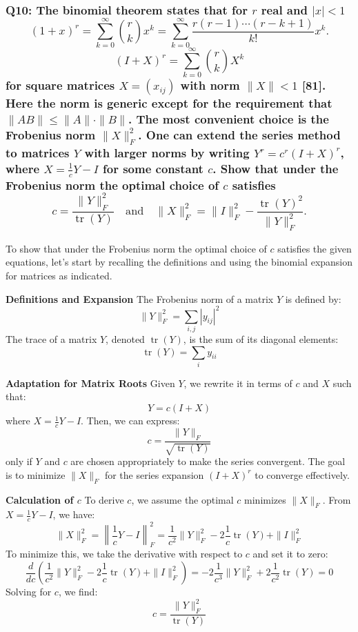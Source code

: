 \documentclass[8pt]{article}
\begin{document}
\subsubsection*{Q10: The binomial theorem states that for \(r\) real and \(|x| < 1\)
\[ (1 + x)^r = \sum_{k=0}^{\infty} \binom{r}{k} x^k = \sum_{k=0}^{\infty} \frac{r(r-1) \cdots (r-k+1)}{k!} x^k. \]
\[ (I + X)^r = \sum_{k=0}^{\infty} \binom{r}{k} X^k \]
for square matrices \(X = (x_{ij})\) with norm \(\|X\| < 1\) [81]. Here the norm is generic except for the requirement that \(\|AB\| \leq \|A\| \cdot \|B\|\). The most convenient choice is the Frobenius norm \(\|X\|_F^2\). One can extend the series method to matrices \(Y\) with larger norms by writing \(Y^r = c^r (I + X)^r\), where \(X = \frac{1}{c}Y - I\) for some constant \(c\). Show that under the Frobenius norm the optimal choice of \(c\) satisfies
\[ c = \frac{\|Y\|_F^2}{\operatorname{tr}(Y)} \quad \text{and} \quad \|X\|_F^2 = \|I\|_F^2 - \frac{\operatorname{tr}(Y)^2}{\|Y\|_F^2}. \]
}

To show that under the Frobenius norm the optimal choice of \(c\) satisfies the given equations, let's start by recalling the definitions and using the binomial expansion for matrices as indicated.

\textbf{Definitions and Expansion}
The Frobenius norm of a matrix \(Y\) is defined by:
\[
\|Y\|_F^2 = \sum_{i,j} |y_{ij}|^2
\]
The trace of a matrix \(Y\), denoted \(\operatorname{tr}(Y)\), is the sum of its diagonal elements:
\[
\operatorname{tr}(Y) = \sum_i y_{ii}
\]

\textbf{Adaptation for Matrix Roots}
Given \(Y\), we rewrite it in terms of \(c\) and \(X\) such that:
\[
Y = c(I + X)
\]
where \(X = \frac{1}{c}Y - I\). Then, we can express:
\[
c = \frac{\|Y\|_F}{\sqrt{\operatorname{tr}(Y)}}
\]
only if \(Y\) and \(c\) are chosen appropriately to make the series convergent. The goal is to minimize \(\|X\|_F\) for the series expansion \((I + X)^r\) to converge effectively.

\textbf{Calculation of \(c\)}
To derive \(c\), we assume the optimal \(c\) minimizes \(\|X\|_F\). From \(X = \frac{1}{c}Y - I\), we have:
\[
\|X\|_F^2 = \left\| \frac{1}{c}Y - I \right\|_F^2 = \frac{1}{c^2}\|Y\|_F^2 - 2 \frac{1}{c} \operatorname{tr}(Y) + \|I\|_F^2
\]
To minimize this, we take the derivative with respect to \(c\) and set it to zero:
\[
\frac{d}{dc}\left( \frac{1}{c^2}\|Y\|_F^2 - 2 \frac{1}{c} \operatorname{tr}(Y) + \|I\|_F^2 \right) = -2 \frac{1}{c^3}\|Y\|_F^2 + 2 \frac{1}{c^2} \operatorname{tr}(Y) = 0
\]
Solving for \(c\), we find:
\[
c = \frac{\|Y\|_F^2}{\operatorname{tr}(Y)}
\]
\end{document}
